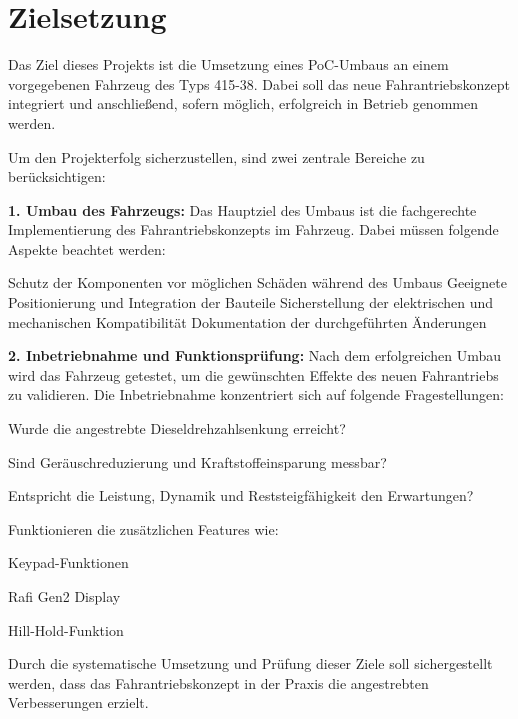 \documentclass[a4paper, 12pt]{article} %
\begin{document}
\section{Zielsetzung}
\begin{spacing}{1.5}  %
    \fontsize{14pt}{14pt}\selectfont  %

Das Ziel dieses Projekts ist die Umsetzung eines \ac{PoC}-Umbaus
 an einem vorgegebenen Fahrzeug des Typs 415-38. 
 Dabei soll das neue Fahrantriebskonzept integriert und anschließend, 
 sofern möglich, erfolgreich in Betrieb genommen werden.

Um den Projekterfolg sicherzustellen,
 sind zwei zentrale Bereiche zu berücksichtigen:

\textbf{1. Umbau des Fahrzeugs:}
Das Hauptziel des Umbaus ist die fachgerechte 
Implementierung des Fahrantriebskonzepts im Fahrzeug. 
Dabei müssen folgende Aspekte beachtet werden:

Schutz der Komponenten vor möglichen Schäden während des Umbaus
Geeignete Positionierung und Integration der Bauteile
Sicherstellung der elektrischen und mechanischen Kompatibilität
Dokumentation der durchgeführten Änderungen

\textbf{2. Inbetriebnahme und Funktionsprüfung:}
Nach dem erfolgreichen Umbau wird das Fahrzeug getestet, 
um die gewünschten Effekte des neuen Fahrantriebs 
zu validieren. Die Inbetriebnahme konzentriert sich auf folgende Fragestellungen:

Wurde die angestrebte Dieseldrehzahlsenkung erreicht?

Sind Geräuschreduzierung und Kraftstoffeinsparung messbar?

Entspricht die Leistung, Dynamik und Reststeigfähigkeit den Erwartungen?

Funktionieren die zusätzlichen Features wie:

Keypad-Funktionen

Rafi Gen2 Display

Hill-Hold-Funktion

Durch die systematische Umsetzung und Prüfung dieser 
Ziele soll sichergestellt werden, dass das Fahrantriebskonzept 
in der Praxis die angestrebten Verbesserungen erzielt.
\end{spacing}
\end{document}
